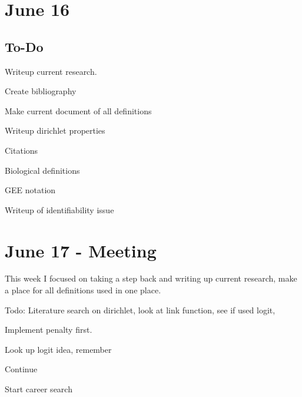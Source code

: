 \documentclass[10pt]{article}
\theoremstyle{definition}
\begin{document}
\section{June 16}



\subsection{To-Do}
\begin{todolist}
  \item Writeup current research.
  \item Create bibliography
  \item Make current document of all definitions
  \item Writeup dirichlet properties
  \item Citations
  \item Biological definitions
  \item GEE notation
  \item Writeup of identifiability issue
\end{todolist}






\newpage
\section{June 17 - Meeting}

This week I focused on taking a step back and writing up current research, make a place for all definitions used in one place.

Todo: 
Literature search on dirichlet, look at link function, see if used logit,

Implement penalty first.

Look up logit idea, remember

Continue

Start career search
\end{document}
